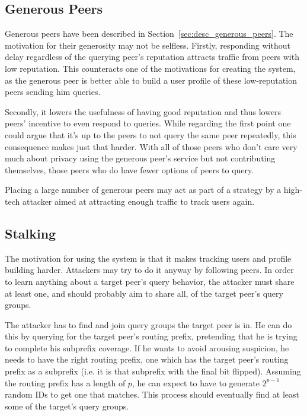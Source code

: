 \subsection{Generous Peers}
\label{sec:desc_attacks_generous}
Generous peers have been described in Section~\ref{sec:desc_generous_peers}.
The motivation for their generosity may not be selfless. Firstly, responding
without delay regardless of the querying peer's reputation attracts traffic from
peers with low reputation. This counteracts one of the motivations for creating
the system, as the generous peer is better able to build a user profile of these
low-reputation peers sending him queries.

Secondly, it lowers the usefulness of having good reputation and thus lowers
peers' incentive to even respond to queries. While regarding the first point one
could argue that it's up to the peers to not query the same peer repeatedly,
this consequence makes just that harder. With all of those peers who don't care
very much about privacy using the generous peer's service but not contributing
themselves, those peers who do have fewer options of peers to query.

Placing a large number of generous peers may act as part of a strategy by a
high-tech attacker aimed at attracting enough traffic to track users again.

\subsection{Stalking}
\label{sec:desc_stalking}
The motivation for using the system is that it makes tracking users and profile
building harder. Attackers may try to do it anyway by following peers. In order
to learn anything about a target peer's query behavior, the attacker must share
at least one, and should probably aim to share all, of the target peer's query
groups.

The attacker has to find and join query groups the target peer is in. He can do
this by querying for the target peer's routing prefix, pretending that he is
trying to complete his subprefix coverage. If he wants to avoid arousing
suspicion, he needs to have the right routing prefix, one which has the target
peer's routing prefix as a subprefix (i.e. it is that subprefix with the final
bit flipped). Assuming the routing prefix has a length of $p$, he can expect to
have to generate $2^{p-1}$ random IDs to get one that matches. This process
should eventually find at least some of the target's query groups.

